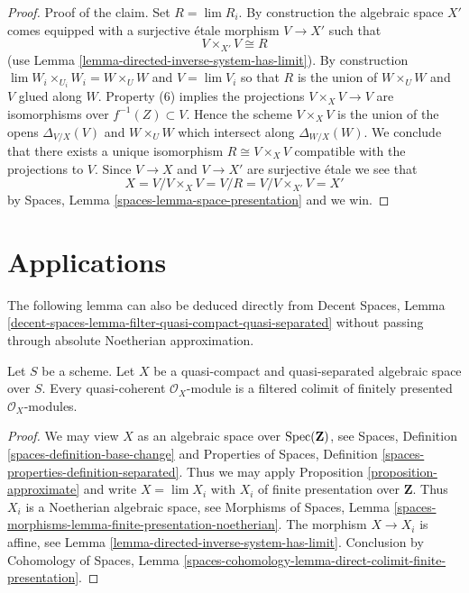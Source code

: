 \begin{proof}
\medskip\noindent
Proof of the claim. Set $R = \lim R_i$.
By construction the algebraic space $X'$ comes
equipped with a surjective \'etale morphism $V \to X'$ such that
$$
V \times_{X'} V \cong R
$$
(use Lemma \ref{lemma-directed-inverse-system-has-limit}).
By construction $\lim W_i \times_{U_i} W_i = W \times_U W$ and $V = \lim V_i$
so that $R$ is the union of $W \times_U W$ and $V$ glued along $W$.
Property (6) implies the projections $V \times_X V \to V$ are isomorphisms
over $f^{-1}(Z) \subset V$. Hence the scheme $V \times_X V$ is the union
of the opens $\Delta_{V/X}(V)$ and $W \times_U W$ which intersect
along $\Delta_{W/X}(W)$. We conclude that there exists a unique isomorphism
$R \cong V \times_X V$ compatible with the projections to $V$.
Since $V \to X$ and $V \to X'$ are surjective \'etale we see that
$$
X = V/ V \times_X V = V/R = V/V \times_{X'} V = X'
$$
by Spaces, Lemma \ref{spaces-lemma-space-presentation} and we win.
\end{proof}




\section{Applications}
\label{section-applications}

\noindent
The following lemma can also be deduced directly from
Decent Spaces, Lemma
\ref{decent-spaces-lemma-filter-quasi-compact-quasi-separated}
without passing through absolute Noetherian approximation.

\begin{lemma}
\label{lemma-colimit-finitely-presented}
Let $S$ be a scheme. Let $X$ be a quasi-compact and quasi-separated algebraic
space over $S$. Every quasi-coherent $\mathcal{O}_X$-module is a
filtered colimit of finitely presented $\mathcal{O}_X$-modules.
\end{lemma}

\begin{proof}
We may view $X$ as an algebraic space over $\mathop{\mathrm{Spec}}(\mathbf{Z})$, see
Spaces, Definition \ref{spaces-definition-base-change} and
Properties of Spaces, Definition \ref{spaces-properties-definition-separated}.
Thus we may apply Proposition \ref{proposition-approximate}
and write $X = \lim X_i$ with $X_i$ of finite presentation over $\mathbf{Z}$.
Thus $X_i$ is a Noetherian algebraic space, see
Morphisms of Spaces, Lemma
\ref{spaces-morphisms-lemma-finite-presentation-noetherian}.
The morphism $X \to X_i$ is affine, see
Lemma \ref{lemma-directed-inverse-system-has-limit}.
Conclusion by
Cohomology of Spaces, Lemma
\ref{spaces-cohomology-lemma-direct-colimit-finite-presentation}.
\end{proof}


